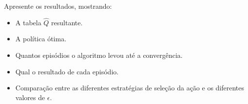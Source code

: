 \begin{exercise}
Apresente os resultados, mostrando:
\begin{itemize}
	\item A tabela $\widehat{Q}$ resultante.
	\item A política ótima.
	\item Quantos episódios o algoritmo levou até a convergência.
	\item Qual o resultado de cada episódio.
	\item Comparação entre as diferentes estratégias de seleção da ação e os diferentes valores de $\epsilon$.
\end{itemize}

\end{exercise}

